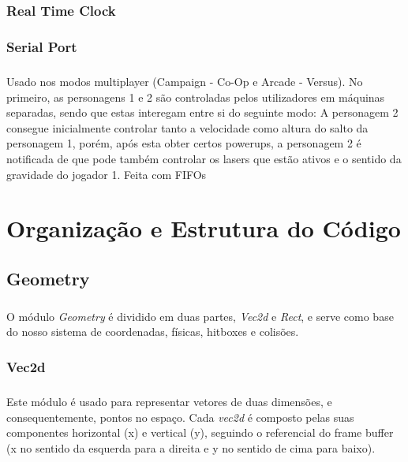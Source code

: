\documentclass{report}
\begin{document}
\subsection{Real Time Clock}

\subsection{Serial Port}

\paragraph{}
Usado nos modos multiplayer (Campaign - Co-Op e Arcade - Versus). No primeiro, as personagens 1 e 2 são controladas pelos utilizadores em máquinas separadas, sendo que estas interegam entre si do seguinte modo: A personagem 2 consegue inicialmente controlar tanto a velocidade como altura do salto da personagem 1,
porém, após esta obter certos powerups, a personagem 2 é notificada de que pode também controlar os lasers que estão ativos e o sentido da gravidade do jogador 1.
Feita com FIFOs

\chapter{Organização e Estrutura do Código}

\section{Geometry}

\paragraph{}
O módulo \textit{Geometry} é dividido em duas partes, \textit{Vec2d} e \textit{Rect}, e serve como base do nosso sistema de coordenadas, físicas, hitboxes e colisões.

\subsection{Vec2d}

\paragraph{}
Este módulo é usado para representar vetores de duas dimensões, e consequentemente, pontos no espaço. Cada \textit{vec2d} é composto pelas suas componentes horizontal (x) e vertical (y), seguindo o referencial do frame buffer (x no sentido da esquerda para a direita e y no sentido de cima para baixo).
\end{document}
